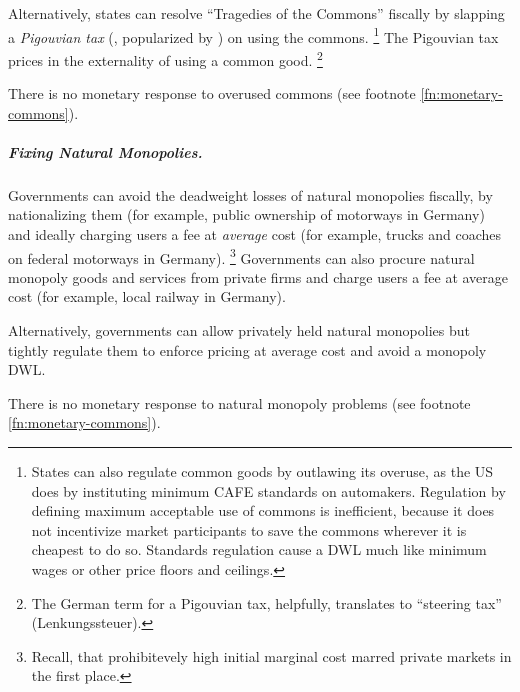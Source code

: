 Alternatively, states can resolve ``Tragedies of the Commons'' \citep{Hardin-1968-aa} fiscally by slapping a \emph{Pigouvian tax} (\citealt{Pigou1912}, popularized by \citealt{Baumol1972}) on using the commons.
\footnote{
	States can also regulate common goods by outlawing its overuse, as the US does by instituting minimum \gls{CAFE} standards on automakers.
	Regulation by defining maximum acceptable use of commons is inefficient, because it does not incentivize market participants to save the commons wherever it is cheapest to do so.
	Standards regulation cause a \gls{DWL} much like minimum wages or other price floors and ceilings.
}
The Pigouvian tax prices in the externality of using a common good.
\footnote{
	The German term for a Pigouvian tax, helpfully, translates to ``steering tax'' (Lenkungssteuer).
}

There is no monetary response to overused commons (see footnote \ref{fn:monetary-commons}).

\subparagraph{Fixing Natural Monopolies.}  \label{sec:natural-monopoly-response}
Governments can avoid the deadweight losses of natural monopolies fiscally, by nationalizing them (for example, public ownership of motorways in Germany) and ideally charging users a fee at \emph{average} cost (for example, trucks and coaches on federal motorways in Germany).
\footnote{\label{fn:why-ac-fees}
	Recall, that prohibitevely high initial marginal cost marred private markets in the first place.
}
Governments can also procure natural monopoly goods and services from private firms and charge users a fee at average cost (for example, local railway in Germany).

Alternatively, governments can allow privately held natural monopolies but tightly regulate them to enforce pricing at average cost and avoid a monopoly \gls{DWL}.

There is no monetary response to natural monopoly problems (see footnote \ref{fn:monetary-commons}).


